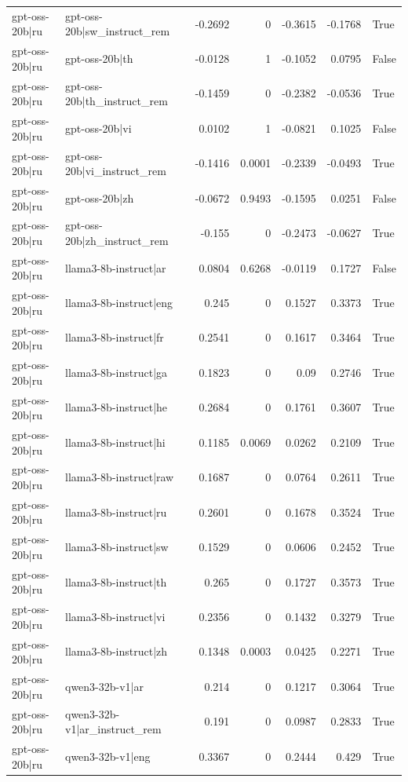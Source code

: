 \begin{table}
\begin{tabular}{l l r r r r l}
gpt-oss-20b|ru & gpt-oss-20b|sw_instruct_rem & -0.2692 & 0 & -0.3615 & -0.1768 & True \\
gpt-oss-20b|ru & gpt-oss-20b|th & -0.0128 & 1 & -0.1052 & 0.0795 & False \\
gpt-oss-20b|ru & gpt-oss-20b|th_instruct_rem & -0.1459 & 0 & -0.2382 & -0.0536 & True \\
gpt-oss-20b|ru & gpt-oss-20b|vi & 0.0102 & 1 & -0.0821 & 0.1025 & False \\
gpt-oss-20b|ru & gpt-oss-20b|vi_instruct_rem & -0.1416 & 0.0001 & -0.2339 & -0.0493 & True \\
gpt-oss-20b|ru & gpt-oss-20b|zh & -0.0672 & 0.9493 & -0.1595 & 0.0251 & False \\
gpt-oss-20b|ru & gpt-oss-20b|zh_instruct_rem & -0.155 & 0 & -0.2473 & -0.0627 & True \\
gpt-oss-20b|ru & llama3-8b-instruct|ar & 0.0804 & 0.6268 & -0.0119 & 0.1727 & False \\
gpt-oss-20b|ru & llama3-8b-instruct|eng & 0.245 & 0 & 0.1527 & 0.3373 & True \\
gpt-oss-20b|ru & llama3-8b-instruct|fr & 0.2541 & 0 & 0.1617 & 0.3464 & True \\
gpt-oss-20b|ru & llama3-8b-instruct|ga & 0.1823 & 0 & 0.09 & 0.2746 & True \\
gpt-oss-20b|ru & llama3-8b-instruct|he & 0.2684 & 0 & 0.1761 & 0.3607 & True \\
gpt-oss-20b|ru & llama3-8b-instruct|hi & 0.1185 & 0.0069 & 0.0262 & 0.2109 & True \\
gpt-oss-20b|ru & llama3-8b-instruct|raw & 0.1687 & 0 & 0.0764 & 0.2611 & True \\
gpt-oss-20b|ru & llama3-8b-instruct|ru & 0.2601 & 0 & 0.1678 & 0.3524 & True \\
gpt-oss-20b|ru & llama3-8b-instruct|sw & 0.1529 & 0 & 0.0606 & 0.2452 & True \\
gpt-oss-20b|ru & llama3-8b-instruct|th & 0.265 & 0 & 0.1727 & 0.3573 & True \\
gpt-oss-20b|ru & llama3-8b-instruct|vi & 0.2356 & 0 & 0.1432 & 0.3279 & True \\
gpt-oss-20b|ru & llama3-8b-instruct|zh & 0.1348 & 0.0003 & 0.0425 & 0.2271 & True \\
gpt-oss-20b|ru & qwen3-32b-v1|ar & 0.214 & 0 & 0.1217 & 0.3064 & True \\
gpt-oss-20b|ru & qwen3-32b-v1|ar_instruct_rem & 0.191 & 0 & 0.0987 & 0.2833 & True \\
gpt-oss-20b|ru & qwen3-32b-v1|eng & 0.3367 & 0 & 0.2444 & 0.429 & True \\

\end{tabular}
\end{table}
